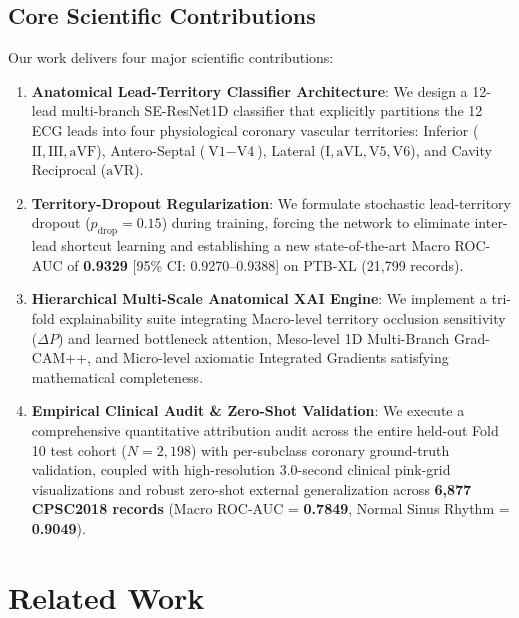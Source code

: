 \documentclass[12pt]{elsarticle}
\begin{document}
\subsection{Core Scientific Contributions}
Our work delivers four major scientific contributions:
\begin{enumerate}
    \item \textbf{Anatomical Lead-Territory Classifier Architecture}: We design a 12-lead multi-branch SE-ResNet1D classifier that explicitly partitions the 12 ECG leads into four physiological coronary vascular territories: Inferior ($\text{II}, \text{III}, \text{aVF}$), Antero-Septal ($\text{V1}-\text{V4}$), Lateral ($\text{I}, \text{aVL}, \text{V5}, \text{V6}$), and Cavity Reciprocal ($\text{aVR}$).
    \item \textbf{Territory-Dropout Regularization}: We formulate stochastic lead-territory dropout ($p_{\text{drop}} = 0.15$) during training, forcing the network to eliminate inter-lead shortcut learning and establishing a new state-of-the-art Macro ROC-AUC of \textbf{0.9329} [95\% CI: 0.9270--0.9388] on PTB-XL (21,799 records).
    \item \textbf{Hierarchical Multi-Scale Anatomical XAI Engine}: We implement a tri-fold explainability suite integrating Macro-level territory occlusion sensitivity ($\Delta P$) and learned bottleneck attention, Meso-level 1D Multi-Branch Grad-CAM++, and Micro-level axiomatic Integrated Gradients satisfying mathematical completeness.
    \item \textbf{Empirical Clinical Audit \& Zero-Shot Validation}: We execute a comprehensive quantitative attribution audit across the entire held-out Fold 10 test cohort ($N=2,198$) with per-subclass coronary ground-truth validation, coupled with high-resolution 3.0-second clinical pink-grid visualizations and robust zero-shot external generalization across \textbf{6,877 CPSC2018 records} (Macro ROC-AUC = \textbf{0.7849}, Normal Sinus Rhythm = \textbf{0.9049}).
\end{enumerate}


\section{Related Work}
\label{sec:related}
\end{document}
